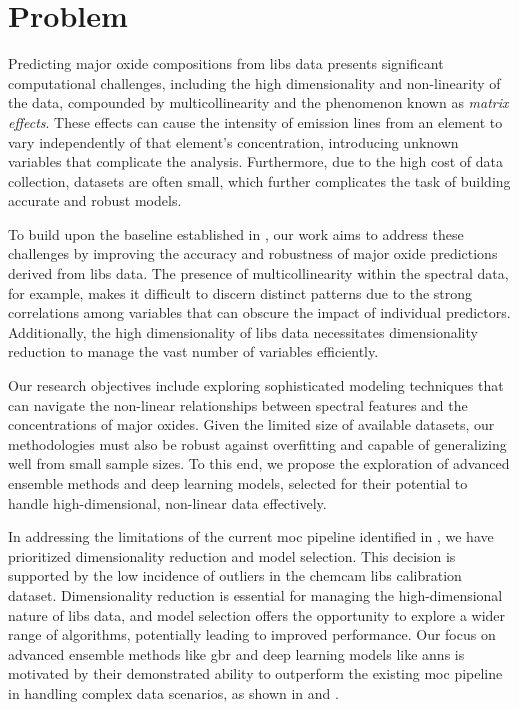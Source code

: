 \section{Problem}
\label{sec:problem_definition}

Predicting major oxide compositions from \gls{libs} data presents significant computational challenges, including the high dimensionality and non-linearity of the data, compounded by multicollinearity and the phenomenon known as \textit{matrix effects}.
These effects can cause the intensity of emission lines from an element to vary independently of that element's concentration, introducing unknown variables that complicate the analysis.
Furthermore, due to the high cost of data collection, datasets are often small, which further complicates the task of building accurate and robust models.

To build upon the baseline established in \citet{p9_paper}, our work aims to address these challenges by improving the accuracy and robustness of major oxide predictions derived from \gls{libs} data.
The presence of multicollinearity within the spectral data, for example, makes it difficult to discern distinct patterns due to the strong correlations among variables that can obscure the impact of individual predictors.
Additionally, the high dimensionality of \gls{libs} data necessitates dimensionality reduction to manage the vast number of variables efficiently.

Our research objectives include exploring sophisticated modeling techniques that can navigate the non-linear relationships between spectral features and the concentrations of major oxides.
Given the limited size of available datasets, our methodologies must also be robust against overfitting and capable of generalizing well from small sample sizes.
To this end, we propose the exploration of advanced ensemble methods and deep learning models, selected for their potential to handle high-dimensional, non-linear data effectively.

In addressing the limitations of the current \gls{moc} pipeline identified in \citet{p9_paper}, we have prioritized dimensionality reduction and model selection.
This decision is supported by the low incidence of outliers in the \gls{chemcam} \gls{libs} calibration dataset.
Dimensionality reduction is essential for managing the high-dimensional nature of \gls{libs} data, and model selection offers the opportunity to explore a wider range of algorithms, potentially leading to improved performance.
Our focus on advanced ensemble methods like \gls{gbr} and deep learning models like \gls{ann}s is motivated by their demonstrated ability to outperform the existing \gls{moc} pipeline in handling complex data scenarios, as shown in \citet{p9_paper} and \citet{andersonPostlandingMajorElement2022}.

